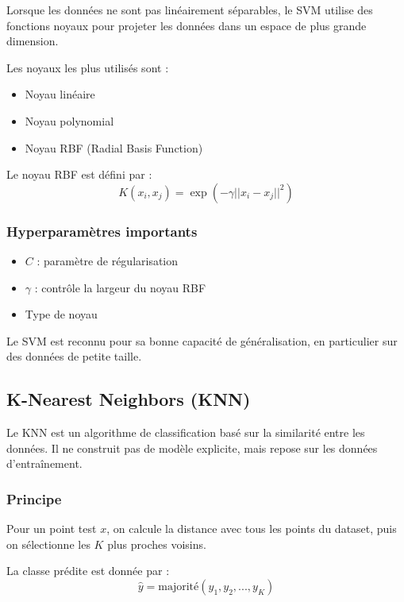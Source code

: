 \documentclass[12pt,a4paper]{article}
\begin{document}
    Lorsque les données ne sont pas linéairement séparables, le SVM utilise des fonctions noyaux pour projeter les données dans un espace de plus grande dimension.

    Les noyaux les plus utilisés sont :
    \begin{itemize}
        \item Noyau linéaire
        \item Noyau polynomial
        \item Noyau RBF (Radial Basis Function)
    \end{itemize}

    Le noyau RBF est défini par :
    \[
    K(x_i, x_j) = \exp\left(-\gamma ||x_i - x_j||^2\right)
    \]

    \subsubsection{Hyperparamètres importants}

    \begin{itemize}
        \item \(C\) : paramètre de régularisation
        \item \(\gamma\) : contrôle la largeur du noyau RBF
        \item Type de noyau
    \end{itemize}

    Le SVM est reconnu pour sa bonne capacité de généralisation, en particulier sur des données de petite taille.

    \subsection{K-Nearest Neighbors (KNN)}

    Le KNN est un algorithme de classification basé sur la similarité entre les données.
    Il ne construit pas de modèle explicite, mais repose sur les données d’entraînement.

    \subsubsection{Principe}

    Pour un point test \(x\), on calcule la distance avec tous les points du dataset, puis on sélectionne les \(K\) plus proches voisins.

    La classe prédite est donnée par :
    \[
    \hat{y} = \text{majorité}(y_{1}, y_{2}, ..., y_{K})
    \]
\end{document}
